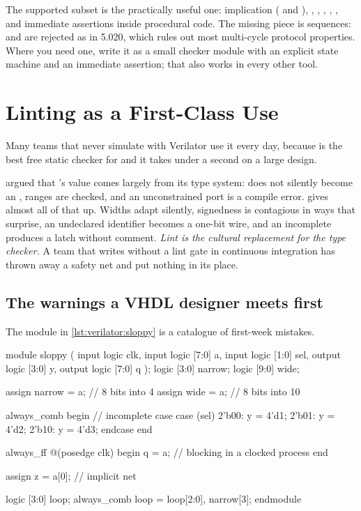 The supported subset is the practically useful one: implication (\code{|->} and
\code{|=>}), , , , ,
,  and immediate assertions inside procedural code.
The missing piece is sequences:  and  are
rejected as  in 5.020, which rules out most multi-cycle
protocol properties. Where you need one, write it as a small checker \RTL{}
module with an explicit state machine and an immediate assertion; that also
works in every other tool.

\section{Linting as a First-Class Use}
\label{sec:verilator:lint}

Many teams that never simulate with Verilator
use it every day, because  is the best free
static checker for \SV{} and it takes under a second on a large design.

 argued that \VHDL{}'s value comes largely from its type
system:  does not silently become an ,
ranges are checked, and an unconstrained port is a compile error. \SV{} gives
almost all of that up. Widths adapt silently, signedness is contagious in ways
that surprise, an undeclared identifier becomes a one-bit wire, and an
incomplete  produces a latch without comment. \emph{Lint is the
cultural replacement for the \VHDL{} type checker.} A team that writes \SV{}
without a lint gate in continuous integration has thrown away a safety net and
put nothing in its place.

\subsection{The warnings a VHDL designer meets first}

The module in \cref{lst:verilator:sloppy} is a catalogue of first-week
mistakes.

\begin{svcode}[caption={\file{sloppy.sv}: every mistake at once},label={lst:verilator:sloppy}]
module sloppy (
  input  logic        clk,
  input  logic [7:0]  a,
  input  logic [1:0]  sel,
  output logic [3:0]  y,
  output logic [7:0]  q
);
  logic [3:0] narrow;
  logic [9:0] wide;

  assign narrow = a;          // 8 bits into 4
  assign wide   = a;          // 8 bits into 10

  always_comb begin           // incomplete case
    case (sel)
      2'b00: y = 4'd1;
      2'b01: y = 4'd2;
      2'b10: y = 4'd3;
    endcase
  end

  always_ff @(posedge clk) begin
    q = a;                    // blocking in a clocked process
  end

  assign z = a[0];            // implicit net

  logic [3:0] loop;
  always_comb loop = {loop[2:0], narrow[3]};
endmodule
\end{svcode}

